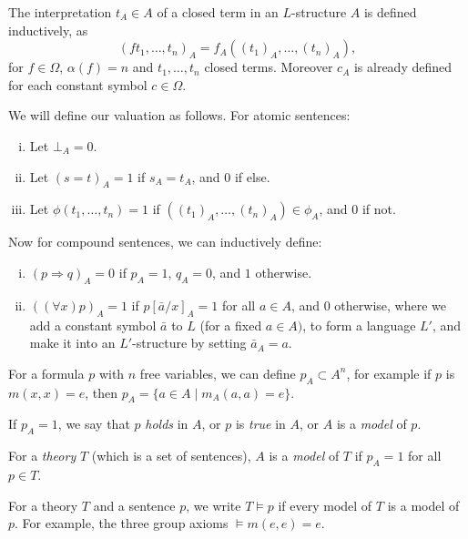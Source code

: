 \documentclass[12pt]{article}
\begin{document}
The interpretation $t_A \in A$ of a closed term in an $L$-structure $A$ is defined inductively, as
\[
	(ft_1,\ldots,t_n)_A = f_A((t_1)_A, \ldots, (t_n)_A),
\]
for $f \in \Omega$, $\alpha(f) = n$ and $t_1, \ldots, t_n$ closed terms. Moreover $c_A$ is already defined for each constant symbol $c \in \Omega$.

We will define our valuation as follows. For atomic sentences:
\begin{enumerate}[(i)]
	\item Let $\bot_A = 0$.
	\item Let $(s = t)_A = 1$ if $s_A = t_A$, and $0$ if else.
	\item Let $\phi(t_1,\ldots,t_n) = 1$ if $((t_1)_A, \ldots, (t_n)_A) \in \phi_A$, and $0$ if not.
\end{enumerate}

Now for compound sentences, we can inductively define:
\begin{enumerate}[(i)]
	\item $(p \Rightarrow q)_A = 0$ if $p_A = 1$, $q_A = 0$, and $1$ otherwise.
	\item $((\forall x)p)_A = 1$ if $p[\bar a/x]_A = 1$ for all $a \in A$, and $0$ otherwise, where we add a constant symbol $\bar a$ to $L$ (for a fixed $a \in A)$, to form a language $L'$, and make it into an $L'$-structure by setting $\bar a_A = a$.
\end{enumerate}

\begin{remark}
	For a formula $p$ with $n$ free variables, we can define $p_A \subset A^{n}$, for example if $p$ is $m(x,x) = e$, then $p_A = \{a \in A \mid m_A(a,a) = e\}$.
\end{remark}

If $p_A = 1$, we say that $p$ \emph{holds} in $A$, or $p$ is \emph{true} in $A$, or $A$ is a \emph{model} of $p$.

For a \emph{theory} $T$ (which is a set of sentences), $A$ is a \emph{model} of $T$ if $p_A = 1$ for all $p \in T$.

For a theory $T$ and a sentence $p$, we write $T \models p$ if every model of $T$ is a model of $p$. For example, the three group axioms $\models m(e,e) = e$.
\end{document}
